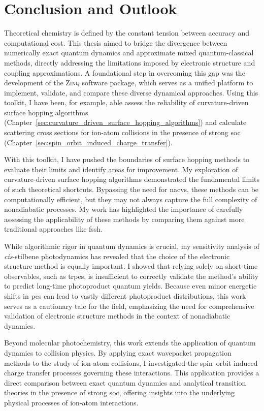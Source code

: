 \chapter{Conclusion and Outlook}
Theoretical chemistry is defined by the constant tension between accuracy and computational cost. This thesis aimed to bridge the divergence between numerically exact quantum dynamics and approximate mixed quantum-classical methods, directly addressing the limitations imposed by electronic structure and coupling approximations. A foundational step in overcoming this gap was the development of the \textsc{Zinq} software package, which serves as a unified platform to implement, validate, and compare these diverse dynamical approaches. Using this toolkit, I have been, for example, able assess the reliability of curvature-driven surface hopping algorithms (Chapter~\ref{sec:curvature_driven_surface_hopping_algorithms}) and calculate scattering cross sections for ion-atom collisions in the presence of strong \gls{soc} (Chapter~\ref{sec:spin_orbit_induced_charge_transfer}).

With this toolkit, I have pushed the boundaries of surface hopping methods to evaluate their limits and identify areas for improvement. My exploration of curvature-driven surface hopping algorithms demonstrated the fundamental limits of such theoretical shortcuts. Bypassing the need for \glspl{nacv}, these methods can be computationally efficient, but they may not always capture the full complexity of nonadiabatic processes. My work has highlighted the importance of carefully assessing the applicability of these methods by comparing them against more traditional approaches like \gls{fssh}.

While algorithmic rigor in quantum dynamics is crucial, my sensitivity analysis of \textit{cis}-stilbene photodynamics has revealed that the choice of the electronic structure method is equally important. I showed that relying solely on short-time observables, such as \gls{trpes}, is insufficient to correctly validate the method's ability to predict long-time photoproduct quantum yields. Because even minor energetic shifts in \gls{pes} can lead to vastly different photoproduct distributions, this work serves as a cautionary tale for the field, emphasizing the need for comprehensive validation of electronic structure methods in the context of nonadiabatic dynamics.

Beyond molecular photochemistry, this work extends the application of quantum dynamics to collision physics. By applying exact wavepacket propagation methods to the study of ion-atom collisions, I investigated the spin--orbit induced charge transfer processes governing these interactions. This application provides a direct comparison between exact quantum dynamics and analytical transition theories in the presence of strong \gls{soc}, offering insights into the underlying physical processes of ion-atom interactions.

